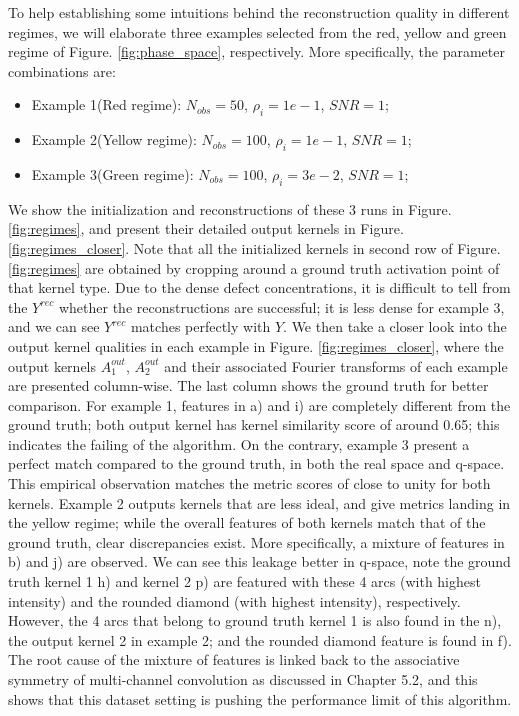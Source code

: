 To help establishing some intuitions behind the reconstruction quality in different regimes, we will elaborate three examples selected from the red, yellow and green regime of Figure. \ref{fig:phase_space}, respectively. More specifically, the parameter combinations are: 
\begin{itemize}
	\item Example 1(Red regime): $N_{obs} = 50$, $\rho_i = 1e-1$, $SNR = 1$;
	\item Example 2(Yellow regime): $N_{obs} = 100$, $\rho_i = 1e-1$, $SNR = 1$;
	\item Example 3(Green regime): $N_{obs} = 100$, $\rho_i = 3e-2$, $SNR = 1$;
\end{itemize}

We show the initialization and reconstructions of these 3 runs in Figure. \ref{fig:regimes}, and present their detailed output kernels in Figure. \ref{fig:regimes_closer}. Note that all the initialized kernels in second row of Figure. \ref{fig:regimes} are obtained by cropping around a ground truth activation point of that kernel type. Due to the dense defect concentrations, it is difficult to tell from the $Y^{rec}$ whether the reconstructions are successful; it is less dense for example 3, and we can see $Y^{rec}$ matches perfectly with $Y$. We then take a closer look into the output kernel qualities in each example in Figure. \ref{fig:regimes_closer}, where the output kernels $A_1^{out}$, $A_2^{out}$ and their associated Fourier transforms of each example are presented column-wise. The last column shows the ground truth for better comparison. For example 1, features in a) and i) are completely different from the ground truth; both output kernel has kernel similarity score of around 0.65; this indicates the failing of the algorithm. On the contrary, example 3 present a perfect match compared to the ground truth, in both the real space and q-space. This empirical observation matches the metric scores of close to unity for both kernels. Example 2 outputs kernels that are less ideal, and give metrics landing in the yellow regime; while the overall features of both kernels match that of the ground truth, clear discrepancies exist. More specifically, a mixture of features in b) and j) are observed. We can see this leakage better in q-space, note the ground truth kernel 1 h) and kernel 2 p) are featured with these 4 arcs (with highest intensity) and the rounded diamond (with highest intensity), respectively. However, the 4 arcs that belong to ground truth kernel 1 is also found in the n), the output kernel 2 in example 2; and the rounded diamond feature is found in f). The root cause of the mixture of features is linked back to the associative symmetry of multi-channel convolution as discussed in Chapter 5.2, and this shows that this dataset setting is pushing the performance limit of this algorithm.



